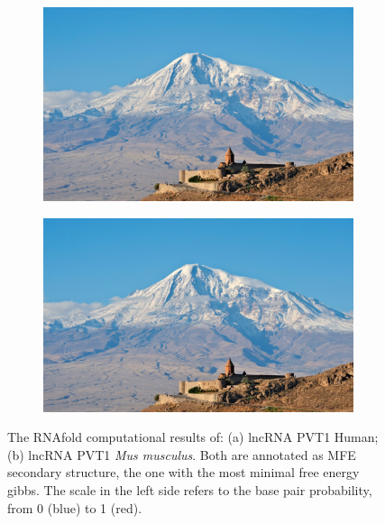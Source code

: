 \documentclass[10pt,twocolumn,twoside]{base/ijb}
\begin{document}
\begin{figure}[t]
  \centering
  \captionsetup[subfigure]{justification=centering}
  \begin{subfigure}[b]{0.37\textwidth}
    \includegraphics[width=\textwidth]{figures/example-figure}
    \caption{}
    \label{fig:1a}
  \end{subfigure}
  \qquad %
  \begin{subfigure}[b]{0.37\textwidth}
    \includegraphics[width=\textwidth]{figures/example-figure}
    \caption{}
    \label{fig:1b}
  \end{subfigure}
  \caption{The RNAfold computational results of: (a) lncRNA PVT1 Human;  (b) lncRNA PVT1 \textit{Mus musculus}. Both are annotated as MFE secondary structure, the one with the most minimal free energy gibbs. The scale in the left side refers to the base pair probability, from 0 (blue) to 1 (red).}
  \label{fig:1}
\end{figure}
\end{document}
